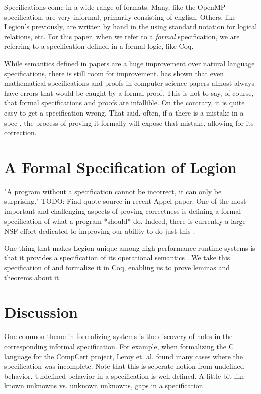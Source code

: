 \documentclass[sigconf]{acmart}
\begin{document}
Specifications come in a wide range of formats. Many, like the OpenMP
specification, are very informal, primarily consisting of english. Others, like
Legion's previously, are written by hand in the using standard notation for
logical relations, etc. For this paper, when we refer to a \emph{formal}
specification, we are referring to a specification defined in a formal logic,
like Coq. 

While semantics defined in papers are a huge improvement over natural language
specifications, there is still room for improvement. \cite{formalspec vs paper} has 
shown that even mathematical specifications and proofs in computer science
papers almost always have errors that would be caught by a formal proof. This is not to say,
of course, that formal specifications and proofs are infallible. On the contrary, it 
is quite easy to get a specification wrong. That said, often, if a there is a mistake in a spec
, the process of proving it formally will expose that mistake, allowing for its correction. 

\section{A Formal Specification of Legion}

"A program without a specification cannot be incorrect, it can only be
surprising." TODO: Find quote source in recent Appel paper. One of the most
important and challenging aspects of proving correctness is defining a formal
specification of what a program *should* do. Indeed, there is currently a large
NSF effort dedicated to improving our ability to do just this \cite{deepspec}. 

One thing that makes Legion unique among high performance runtime systems is
that it provides a specification of its operational semantics \cite{oopsla13}.
We take this specification of and formalize it in Coq, enabling us to prove
lemmas and theorems about it.

\section{Discussion}

One common theme in formalizing systems is the discovery of holes in the
corresponding informal specification. For example, when formalizing the C
language for the CompCert project, Leroy et. al. found many cases where the
specification was incomplete. Note that this is seperate notion from undefined
behavior. Undefined behavior in a specification is well defined. A little bit
like known unknowns vs. unknown unknowns, gaps in a specification  
\end{document}
